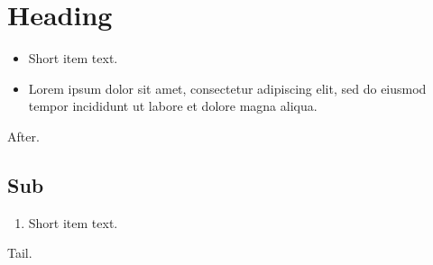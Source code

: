 \documentclass[10pt]{article}
\begin{document}
\section{Heading}
\begin{itemize}
\item Short item text.
\item Lorem ipsum dolor sit amet, consectetur adipiscing elit, sed do eiusmod tempor incididunt ut labore et dolore magna aliqua.
\end{itemize}
After.
\subsection{Sub}
\begin{enumerate}
\item Short item text.
\end{enumerate}
Tail.
\end{document}
